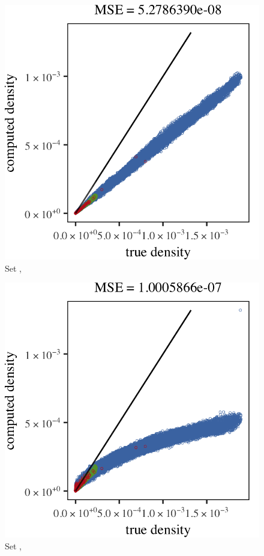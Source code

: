 
\begin{subfigure}{0.23\textwidth}
	\centering
	\includegraphics[keepaspectratio=true, width=\textwidth, height=0.23\textheight]{result/img/all/results_ferdosi_2_60000_mbe_silverman}
	\caption{Set \ferdosiTwo, \mbe}
	\label{fig:4:results:mbe:ferdosi2}
\end{subfigure}
\begin{subfigure}{0.23\textwidth}
	\centering
	\includegraphics[keepaspectratio=true, width=\textwidth, height=0.23\textheight]{result/img/all/results_ferdosi_2_60000_sambe_silverman}
	\caption{Set \ferdosiTwo, \sambe}
	\label{fig:4:results:sambe:ferdosi2}
\end{subfigure}
